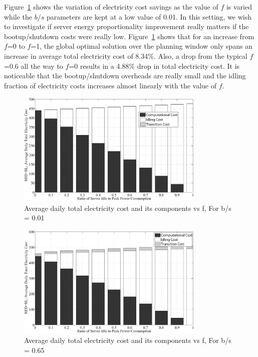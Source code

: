Figure~\ref{fig:fvar1} shows the variation of electricity cost savings as the value of $f$ is varied while the $b$/$s$ parameters are kept at a low value of 0.01. In this setting, we wish to investigate if server energy proportionality improvement really matters if the bootup/shutdown costs were really low. Figure~\ref{fig:fvar1} shows that for an increase from $f$=0 to $f$=1, the global optimal solution over the planning window only spans an increase in average total electricity cost of 8.34\%. Also, a drop from the typical $f$=0.6 all the way to $f$=0 results in a 4.88\% drop in total electricity cost. It is noticeable that the bootup/shutdown overheads are really small and the idling fraction of electricity costs increases almost linearly with the value of $f$.
 
\begin{figure}
\includegraphics[width=0.8\textwidth]{pics/fvar-0.01bs.eps}
\caption{Average daily total electricity cost and its components vs f, For b\slash s = 0.01}
\label{fig:fvar1}
\end{figure}

\begin{figure}
\includegraphics[width=0.8\textwidth]{pics/fvar-0.65bs.eps}
\caption{Average daily total electricity cost and its components vs f, For b\slash s = 0.65}
\label{fig:fvar2}
\end{figure}

